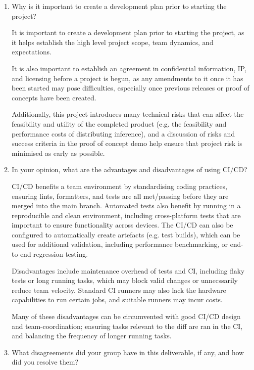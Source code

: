 \documentclass{article}
\begin{document}
\begin{enumerate}
    \item Why is it important to create a development plan prior to starting the
    project?
    
    It is important to create a development plan prior to starting the project, as it helps establish the high level project scope, team dynamics, and expectations.

    It is also important to establish an agreement in confidential information, IP, and licensing before a project is begun, as any amendments to it once it has been started may pose difficulties, especially once previous releases or proof of concepts have been created.

    Additionally, this project introduces many technical risks that can affect the feasibility and utility of the completed product (e.g. the feasibility and performance costs of distributing inference), and a discussion of risks and success criteria in the proof of concept demo help ensure that project risk is minimised as early as possible. 

    \item In your opinion, what are the advantages and disadvantages of using
    CI/CD?

    CI/CD benefits a team environment by standardising coding practices, ensuring lints, formatters, and tests are all met/passing before they are merged into the main branch. Automated tests also benefit by running in a reproducible and clean environment, including cross-platform tests that are important to ensure functionality across devices. The CI/CD can also be configured to automatically create artefacts (e.g. test builds), which can be used for additional validation, including performance benchmarking, or end-to-end regression testing.

    Disadvantages include maintenance overhead of tests and CI, including flaky tests or long running tasks, which may block valid changes or unnecssarily reduce team velocity. Standard CI runners may also lack the hardware capabilities to run certain jobs, and suitable runners may incur costs.

    Many of these disadvantages can be circumvented with good CI/CD design and team-coordination; ensuring tasks relevant to the diff are ran in the CI, and balancing the frequency of longer running tasks.

    \item What disagreements did your group have in this deliverable, if any,
    and how did you resolve them?


\end{enumerate}
\end{document}
